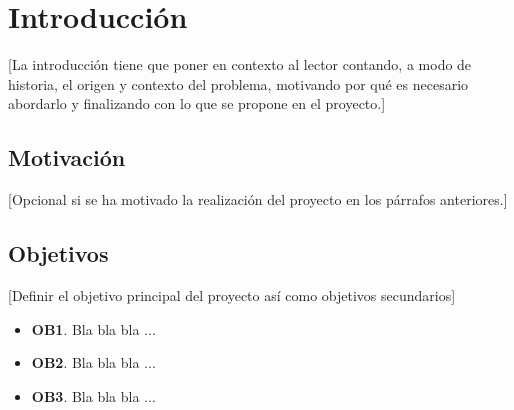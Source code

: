 \chapter{Introducción}\label{cap:introduccion}

[La introducción tiene que poner en contexto al lector contando, a modo de historia, el origen y contexto del problema, motivando por qué es necesario abordarlo y finalizando con lo que se propone en el proyecto.]
\section{Motivación}
 [Opcional si se ha motivado la realización del proyecto en los párrafos anteriores.]

\section{Objetivos}\label{sec:objetivos}

[Definir el objetivo principal del proyecto así como objetivos secundarios]

\begin{itemize}
    \item \textbf{OB1}. Bla bla bla ...
    \item \textbf{OB2}. Bla bla bla ...
    \item \textbf{OB3}. Bla bla bla ...
\end{itemize}

\cite{smith2023eeg}